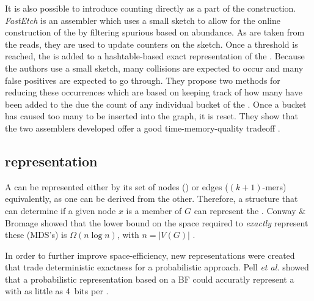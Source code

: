 {It is also possible to introduce \kmer counting directly as a part of the \dBG construction. \emph{FastEtch} is an assembler which uses a small \cm sketch to allow for the online construction of the \dBG by filtering spurious  based on abundance. As  are taken from the reads, they are used to update counters on the \cm sketch. Once a threshold is reached, the \kmer is added to a hashtable-based exact representation of the \dBG. Because the authors use a small \cm sketch, many collisions are expected to occur and many false positives are expected to go through. They propose two methods for reducing these occurrences which are based on keeping track of how many  have been added to the \dBG due the count of any individual bucket of the \cm. Once a bucket has caused too many  to be inserted into the graph, it is reset. They show that the two assemblers developed offer a good time-memory-quality tradeoff \cite{Ghosh2019}.}

\subsection{\dBG representation}
\label{subsec:dBG-representation}

A \dBG can be represented either by its set of nodes () or edges ($(k+1)$-mers) equivalently, as one can be derived from the other. Therefore, a structure that can determine if a given node $x$ is a member of $G$ can represent the \dBG. Conway \& Bromage showed that the lower bound on the space required to \emph{exactly} represent these  (MDS's) is $\Omega(n \log n)$, with $n=|V(G)|$ \cite{Conway2011}. 

In order to further improve space-efficiency, new representations were created that trade deterministic exactness for a probabilistic approach. Pell \emph{et al.} showed that a probabilistic representation based on a BF could accuratly represent a \dBG with as little as 4~bits per \kmer {} \cite{Pell2012}.

